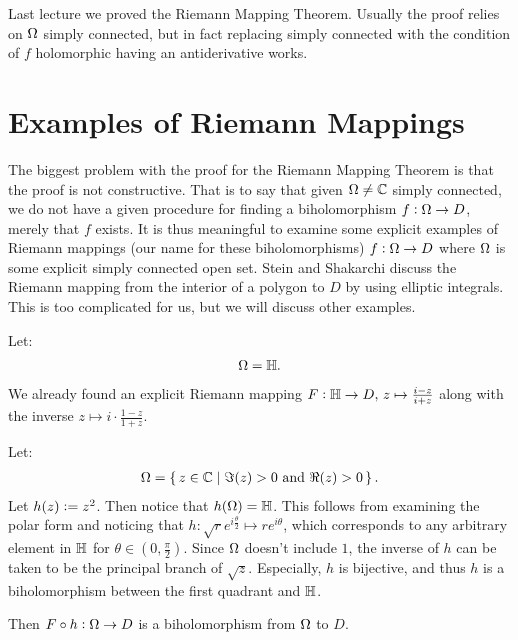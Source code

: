 
\setcounter{section}{0}
\setcounter{theorem}{0}


Last lecture we proved the Riemann Mapping Theorem. Usually the proof relies on $\Omega$ simply connected, but in fact replacing simply connected with the condition of $f$ holomorphic having an antiderivative works.

\section{Examples of Riemann Mappings}


The biggest problem with the proof for the Riemann Mapping Theorem is that the proof is not constructive. That is to say that given $\Omega \neq \mathbb{C}$ simply connected, we do not have a given procedure for finding a biholomorphism $f : \Omega \to D$, merely that $f$ exists. It is thus meaningful to examine some explicit examples of Riemann mappings (our name for these biholomorphisms) $ f : \Omega \to D $ where $\Omega$ is some explicit simply connected open set. Stein and Shakarchi discuss the Riemann mapping from the interior of a polygon to $D$ by using elliptic integrals. This is too complicated for us, but we will discuss other examples.

\begin{example}
Let:
\begin{align*}
    \Omega = \mathbb{H}.
\end{align*}
We already found an explicit Riemann mapping $F : \mathbb{H} \to D, \, z \mapsto \frac{i - z}{i+z}$ along with the inverse $z \mapsto i \cdot \frac{1-z}{1+z}$.

\end{example}

\begin{example}
Let:
\begin{align*}
	\Omega = \set{ z \in \mathbb{C}\mid \Im (z) > 0 \text{ and } \Re (z) >0 }.
\end{align*}
Let $h(z) \vcentcolon = z^2$. Then notice that $h(\Omega ) = \mathbb{H}$. This follows from examining the polar form and noticing that $h: \sqrt{r} e ^{i \frac{\theta}{2}  } \mapsto re^{i \theta}$, which corresponds to any arbitrary element in $\mathbb{H}$ for $\theta \in (0,\frac{\pi}{2} )$. Since $\Omega$ doesn't include $1$, the inverse of $h$ can be taken to be the principal branch of $\sqrt{z}$. Especially, $h$ is bijective, and thus $h$ is a biholomorphism between the first quadrant and $\mathbb{H}$.

Then $F \circ h : \Omega \to D$ is a biholomorphism from $\Omega$ to $D$.
\end{example}

